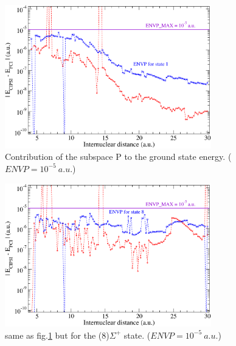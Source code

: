 \documentclass[a4paper,10pt]{article}
\begin{document}
 \begin{figure}[ht!]
  \begin{center}
        \includegraphics[width=0.8\textwidth]{fig/ssp1_tau5.pdf}
    \caption{\label{ssp1} \small Contribution of the subspace P to the ground state energy. ($ENVP=10^{-5}~a.u.$)}
  \end{center}
\end{figure}

 \begin{figure}[hb!]
  \begin{center}
        \includegraphics[width=0.8\textwidth]{fig/ssp8_tau5.pdf}
    \caption{\label{ssp8} \small same as fig.\ref{ssp1} but for the (8)$\Sigma^+$ state. ($ENVP=10^{-5}~a.u.$)}
  \end{center}
\end{figure}

\pagebreak
\end{document}
